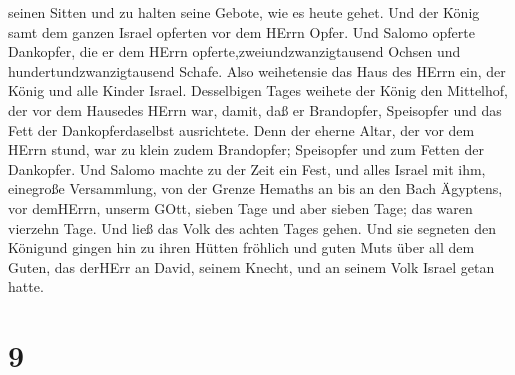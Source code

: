 seinen Sitten und zu halten seine Gebote, wie es heute gehet.
 Und der König samt dem ganzen Israel opferten vor dem
HErrn Opfer.  Und Salomo opferte Dankopfer, die er dem
HErrn opferte,zweiundzwanzigtausend Ochsen und hundertundzwanzigtausend
Schafe. Also weihetensie das Haus des HErrn ein, der König und alle
Kinder Israel.  Desselbigen Tages weihete der König den
Mittelhof, der vor dem Hausedes HErrn war, damit, daß er Brandopfer,
Speisopfer und das Fett der Dankopferdaselbst ausrichtete. Denn der
eherne Altar, der vor dem HErrn stund, war zu klein zudem Brandopfer;
Speisopfer und zum Fetten der Dankopfer.  Und Salomo machte
zu der Zeit ein Fest, und alles Israel mit ihm, einegroße Versammlung,
von der Grenze Hemaths an bis an den Bach Ägyptens, vor demHErrn, unserm
GOtt, sieben Tage und aber sieben Tage; das waren vierzehn Tage.
 Und ließ das Volk des achten Tages gehen. Und sie segneten
den Königund gingen hin zu ihren Hütten fröhlich und guten Muts über all
dem Guten, das derHErr an David, seinem Knecht, und an seinem Volk
Israel getan hatte.

\hypertarget{section-8}{%
\section{9}\label{section-8}}

